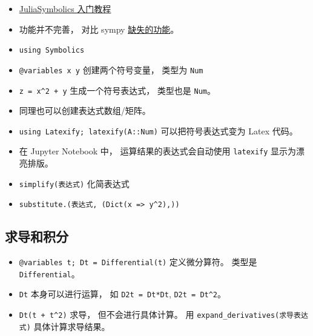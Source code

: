 
\begin{itemize}
\item \href{https://symbolics.juliasymbolics.org/dev/tutorials/symbolic_functions/}{JuliaSymbolics 入门教程}
\item 功能并不完善， 对比 sympy \href{https://github.com/JuliaSymbolics/Symbolics.jl/issues/59}{缺失的功能}。
\item \verb`using Symbolics`
\item \verb`@variables x y` 创建两个符号变量， 类型为 \verb`Num`
\item \verb`z = x^2 + y` 生成一个符号表达式， 类型也是 \verb`Num`。
\item 同理也可以创建表达式数组/矩阵。
\item \verb`using Latexify; latexify(A::Num)` 可以把符号表达式变为 Latex 代码。
\item 在 Jupyter Notebook 中， 运算结果的表达式会自动使用 \verb`latexify` 显示为漂亮排版。
\item \verb`simplify(表达式)` 化简表达式
\item \verb`substitute.(表达式, (Dict(x => y^2),))`
\end{itemize}


\subsection{求导和积分}
\begin{itemize}
\item \verb`@variables t; Dt = Differential(t)` 定义微分算符。 类型是 \verb`Differential`。
\item \verb`Dt` 本身可以进行运算， 如 \verb`D2t = Dt*Dt`, \verb`D2t = Dt^2`。
\item \verb`Dt(t + t^2)` 求导， 但不会进行具体计算。 用 \verb`expand_derivatives(求导表达式)` 具体计算求导结果。
\end{itemize}
